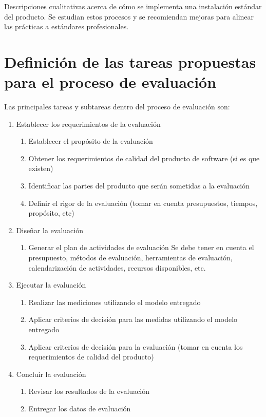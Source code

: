 Descripciones cualitativas acerca de cómo se implementa una instalación estándar del producto.
Se estudian estos procesos y se recomiendan mejoras para alinear las prácticas a estándares profesionales.

\section{Definición de las tareas propuestas para el proceso de evaluación}

Las principales tareas y subtareas dentro del proceso de evaluación son:

\begin{enumerate}
    \item Establecer los requerimientos de la evaluación
        \begin{enumerate}
                \item Establecer el propósito de la evaluación
                \item Obtener los requerimientos de calidad del producto de software (si es que existen)
                \item Identificar las partes del producto que serán sometidas a la evaluación
                \item Definir el rigor de la evaluación (tomar en cuenta presupuestos, tiempos, propósito, etc)
        \end{enumerate}
    \item Diseñar la evaluación
        \begin{enumerate}
                \item Generar el plan de actividades de evaluación
                    Se debe tener en cuenta el presupuesto, métodos de evaluación, herramientas de evaluación, 
                    calendarización de actividades, recursos disponibles, etc.
        \end{enumerate}
    \item Ejecutar la evaluación
        \begin{enumerate}
                \item Realizar las mediciones utilizando el modelo entregado
                \item Aplicar criterios de decisión para las medidas utilizando el modelo entregado
                \item Aplicar criterios de decisión para la evaluación (tomar en cuenta los requerimientos de calidad
                    del producto)
        \end{enumerate}
    \item Concluir la evaluación
        \begin{enumerate}
            \item Revisar los resultados de la evaluación
            \item Entregar los datos de evaluación
        \end{enumerate}
\end{enumerate}

